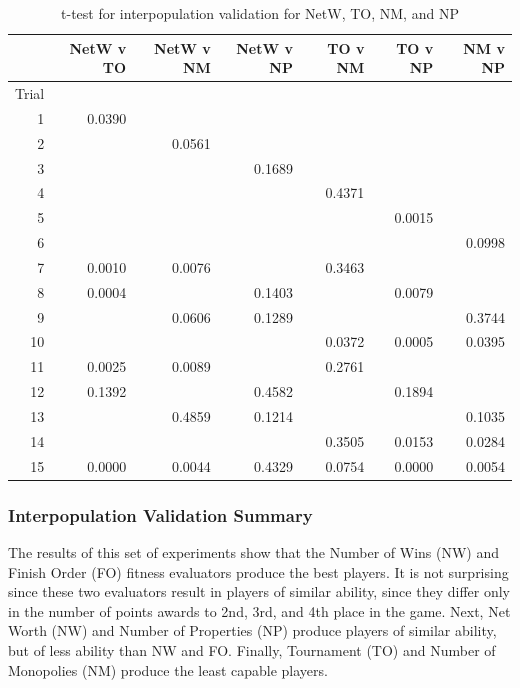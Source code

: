 \begin{table}[htbp]
  \centering
  \caption{t-test for interpopulation validation for NetW, TO, NM, and NP}
    \begin{tabular}{rrrrrrr}
    \toprule
          & NetW v TO & NetW v NM & NetW v NP & TO v NM & TO v NP & NM v NP \\
    \midrule
    Trial &        &        &        &        &        &  \\
    1     & 0.0390 &        &        &        &        &  \\
    2     &        & 0.0561 &        &        &        &  \\
    3     &        &        & 0.1689 &        &        &  \\
    4     &        &        &        & 0.4371 &        &  \\
    5     &        &        &        &        & 0.0015 &  \\
    6     &        &        &        &        &        & 0.0998 \\
    7     & 0.0010 & 0.0076 &        & 0.3463 &        &  \\
    8     & 0.0004 &        & 0.1403 &        & 0.0079 &  \\
    9     &        & 0.0606 & 0.1289 &        &        & 0.3744 \\
    10    &        &        &        & 0.0372 & 0.0005 & 0.0395 \\
    11    & 0.0025 & 0.0089 &        & 0.2761 &        &  \\
    12    & 0.1392 &        & 0.4582 &        & 0.1894 &  \\
    13    &        & 0.4859 & 0.1214 &        &        & 0.1035 \\
    14    &        &        &        & 0.3505 & 0.0153 & 0.0284 \\
    15    & 0.0000 & 0.0044 & 0.4329 & 0.0754 & 0.0000 & 0.0054 \\
    \bottomrule
    \end{tabular}%
  \label{tab:interpop_ttest3}%
\end{table}%

\subsubsection{Interpopulation Validation Summary}

The results of this set of experiments show that the Number of Wins (NW) and
Finish Order (FO) fitness evaluators produce the best players. It is not
surprising since these two evaluators result in players of similar ability,
since they differ only in the number of points awards to 2nd, 3rd, and 4th place
in the game. Next, Net Worth (NW) and Number of Properties (NP) produce players
of similar ability, but of less ability than NW and FO. Finally, Tournament (TO)
and Number of Monopolies (NM) produce the least capable players.

